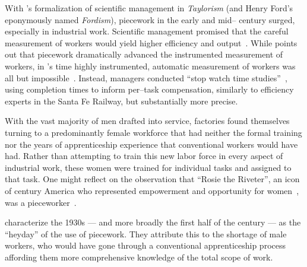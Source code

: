 \documentclass[trackingWork]{subfiles}
\begin{document}
With \citeauthor{taylor1914principles}'s formalization of scientific management in \textit{Taylorism}
(and Henry Ford's eponymously named \textit{Fordism}),
piecework in the early and mid-- century surged, especially in industrial work.
Scientific management promised that the careful measurement of workers would yield
higher efficiency and output~\cite{taylor1914principles,towardsGlobalFordism}.
While \citeauthor{Brown01041990} points out that
piecework dramatically advanced the instrumented measurement of workers,
in \citeauthor{taylor1914principles}'s time highly instrumented,
automatic measurement of workers was all but impossible~\cite{Brown01041990}.
Instead, managers conducted ``stop watch time studies''~\cite{nadworny1955scientific},
using completion times to inform per--task compensation,
similarly to efficiency experts in the Santa Fe Railway, but
substantially more precise.


With the vast majority of men drafted into service,
factories found themselves turning to
a predominantly female workforce that had neither
the formal training nor
the years of apprenticeship experience
that conventional workers would have had.
Rather than attempting to train this new labor force in every aspect of industrial work,
these women were trained for individual tasks
and assigned to that task. %
One might reflect on the observation that ``Rosie the Riveter'',
an icon of  century America who
represented empowerment and opportunity for women~\cite{honey1985creating},
was a pieceworker~\cite{davies2014origins}.



\citeauthor{hart2013rise} characterize the 1930s
--- and more broadly the first half of the  century ---
as the ``heyday'' of the use of piecework.
They attribute this to the shortage of male workers,
who would have gone through a conventional apprenticeship process
affording them more comprehensive knowledge of the total scope of work.
\end{document}
